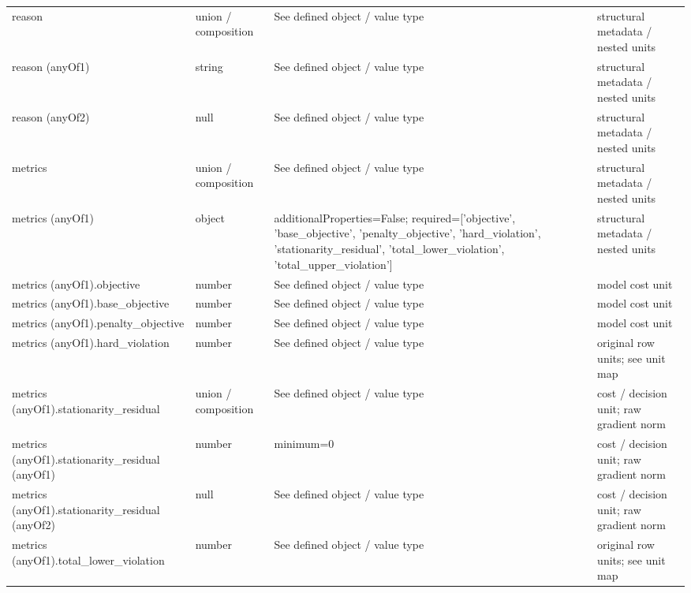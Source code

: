\begin{longtable}{@{}>{\raggedright\arraybackslash}p{}>{\raggedright\arraybackslash}p{}>{\raggedright\arraybackslash}p{}>{\raggedright\arraybackslash}p{}@{}}
reason & union /\allowbreak{} composition & See defined object /\allowbreak{} value type & structural metadata /\allowbreak{} nested units\\
reason (anyOf1) & string & See defined object /\allowbreak{} value type & structural metadata /\allowbreak{} nested units\\
reason (anyOf2) & null & See defined object /\allowbreak{} value type & structural metadata /\allowbreak{} nested units\\
metrics & union /\allowbreak{} composition & See defined object /\allowbreak{} value type & structural metadata /\allowbreak{} nested units\\
metrics (anyOf1) & object & additionalProperties=\allowbreak{}False; required=\allowbreak{}['objective', 'base\_\allowbreak{}objective', 'penalty\_\allowbreak{}objective', 'hard\_\allowbreak{}violation', 'stationarity\_\allowbreak{}residual', 'total\_\allowbreak{}lower\_\allowbreak{}violation', 'total\_\allowbreak{}upper\_\allowbreak{}violation'] & structural metadata /\allowbreak{} nested units\\
metrics (anyOf1).\allowbreak{}objective & number & See defined object /\allowbreak{} value type & model cost unit\\
metrics (anyOf1).\allowbreak{}base\_\allowbreak{}objective & number & See defined object /\allowbreak{} value type & model cost unit\\
metrics (anyOf1).\allowbreak{}penalty\_\allowbreak{}objective & number & See defined object /\allowbreak{} value type & model cost unit\\
metrics (anyOf1).\allowbreak{}hard\_\allowbreak{}violation & number & See defined object /\allowbreak{} value type & original row units; see unit map\\
metrics (anyOf1).\allowbreak{}stationarity\_\allowbreak{}residual & union /\allowbreak{} composition & See defined object /\allowbreak{} value type & cost /\allowbreak{} decision unit; raw gradient norm\\
metrics (anyOf1).\allowbreak{}stationarity\_\allowbreak{}residual (anyOf1) & number & minimum=\allowbreak{}0 & cost /\allowbreak{} decision unit; raw gradient norm\\
metrics (anyOf1).\allowbreak{}stationarity\_\allowbreak{}residual (anyOf2) & null & See defined object /\allowbreak{} value type & cost /\allowbreak{} decision unit; raw gradient norm\\
metrics (anyOf1).\allowbreak{}total\_\allowbreak{}lower\_\allowbreak{}violation & number & See defined object /\allowbreak{} value type & original row units; see unit map\\

\end{longtable}
